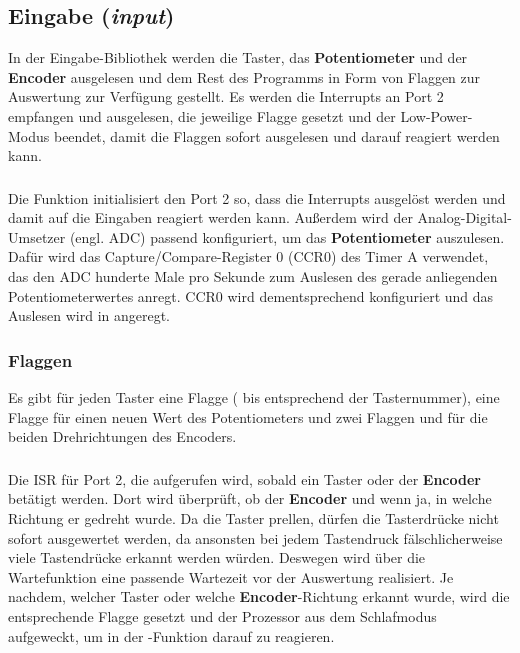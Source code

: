 \subsection{Eingabe (\emph{input})}
In der Eingabe-Bibliothek werden die Taster, das \textbf{Potentiometer} und der \textbf{Encoder} ausgelesen und dem Rest des Programms in Form von Flaggen zur Auswertung zur Verfügung gestellt. Es werden die Interrupts an Port 2 empfangen und ausgelesen, die jeweilige Flagge gesetzt und der Low-Power-Modus beendet, damit die Flaggen sofort ausgelesen und darauf reagiert werden kann.

\subsubsection{}
Die Funktion initialisiert den Port 2 so, dass die Interrupts ausgelöst werden und damit auf die Eingaben reagiert werden kann. Außerdem wird der Analog-Digital-Umsetzer (engl. ADC) passend konfiguriert, um das \textbf{Potentiometer} auszulesen. Dafür wird das Capture/Compare-Register 0 (CCR0) des Timer A verwendet, das den ADC hunderte Male pro Sekunde zum Auslesen des gerade anliegenden Potentiometerwertes anregt. CCR0 wird dementsprechend konfiguriert und das Auslesen wird in  angeregt.

\subsubsection{Flaggen}
Es gibt für jeden Taster eine Flagge ( bis  entsprechend der Tasternummer), eine Flagge  für einen neuen Wert des Potentiometers und zwei Flaggen  und  für die beiden Drehrichtungen des Encoders.

\subsubsection{}
Die ISR für Port 2, die aufgerufen wird, sobald ein Taster oder der \textbf{Encoder} betätigt werden. Dort wird überprüft, ob der \textbf{Encoder} und wenn ja, in welche Richtung er gedreht wurde. Da die Taster prellen, dürfen die Tasterdrücke nicht sofort ausgewertet werden, da ansonsten bei jedem Tastendruck fälschlicherweise viele Tastendrücke erkannt werden würden. Deswegen wird über die Wartefunktion  eine passende Wartezeit vor der Auswertung realisiert. Je nachdem, welcher Taster oder welche \textbf{Encoder}-Richtung erkannt wurde, wird die entsprechende Flagge gesetzt und der Prozessor aus dem Schlafmodus aufgeweckt, um in der -Funktion darauf zu reagieren.

